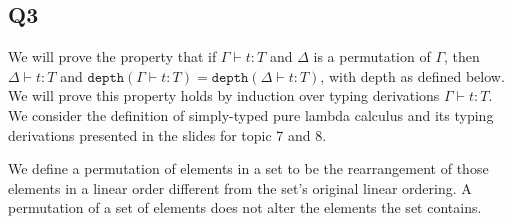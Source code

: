 \documentclass[12pt, fleqn]{article}
\begin{document}
\begin{enumerate}[(a)]
\begin{flagderiv}

    \end{flagderiv}

\end{enumerate}

\subsection{Q3}

We will prove the property that if $\Gamma \vdash t : T$ and $\Delta$ is a permutation of $\Gamma$, then $\Delta \vdash t : T$
and $\texttt{depth}(\Gamma \vdash t: T) = \texttt{depth}(\Delta \vdash t: T)$, with depth as defined below.
We will prove this property holds by induction over typing derivations $\Gamma \vdash t: T$. We consider the definition of simply-typed pure
lambda calculus and its typing derivations presented in the slides for topic 7 and 8.

\medskip
We define a permutation of elements in a set to be the rearrangement of those elements in a linear order different from the set's original
linear ordering. A permutation of a set of elements does not alter the elements the set contains.
\end{document}
